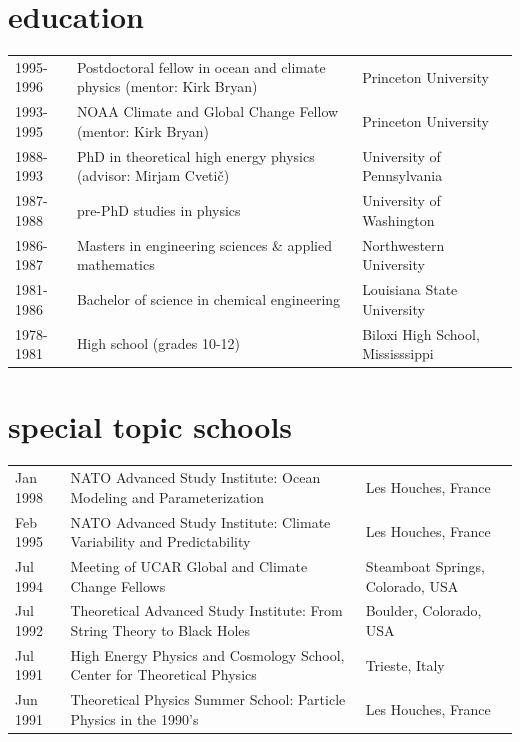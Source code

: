 \documentclass{article}
\begin{document}
\section*{\sc \color{Maroon} education}
\vspace{-.25cm}
\begin{tabular}{lll}
1995-1996  &  Postdoctoral fellow in ocean and climate physics (mentor: Kirk Bryan) & Princeton University 
\\
1993-1995  &  NOAA Climate and Global Change Fellow (mentor: Kirk Bryan) & Princeton University 
\\
1988-1993  &  PhD in theoretical high energy physics 
(advisor: Mirjam Cveti\v{c}) 
& University of Pennsylvania 
\\
1987-1988  &  pre-PhD studies in physics & University of Washington
\\
1986-1987  &  Masters in engineering sciences \& applied mathematics   & Northwestern University\\
1981-1986  &  Bachelor of science in chemical engineering  & Louisiana State University \\
1978-1981  & High school (grades 10-12) & Biloxi High School, Mississsippi
 \end{tabular}


\vspace{-.2cm}
\section*{\sc \color{Maroon} special topic schools}
\vspace{-.25cm}
\begin{tabular}{lll}
Jan 1998  &  NATO Advanced Study Institute: {\sc Ocean Modeling and Parameterization} & Les Houches, France 
\\
Feb 1995 & NATO Advanced Study Institute: {\sc Climate Variability and Predictability} & Les Houches, France
\\
Jul 1994 & Meeting of UCAR Global and Climate Change Fellows & Steamboat Springs, Colorado, USA
\\
Jul 1992 & Theoretical Advanced Study Institute: {\sc From String Theory to Black Holes} & Boulder, Colorado, USA
\\
Jul 1991 & High Energy Physics and Cosmology School, Center for Theoretical Physics & Trieste, Italy
\\
Jun 1991 & Theoretical Physics Summer School: {\sc Particle Physics in the 1990's} & Les Houches, France
 \end{tabular}
\end{document}
